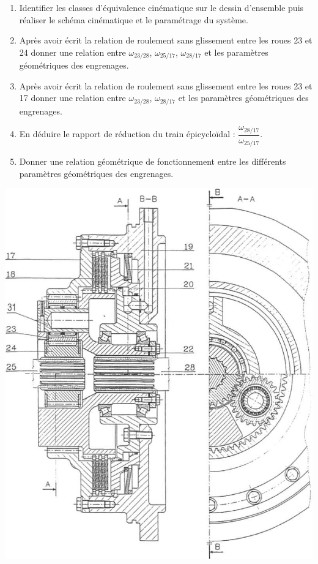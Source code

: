 \documentclass[10pt,oneside]{article}
\begin{document}
\begin{minipage}[c]{.4\linewidth}

\begin{enumerate}
\item Identifier les classes d'équivalence cinématique sur le dessin d'ensemble puis réaliser le schéma cinématique et le paramétrage du système.
\item Après avoir écrit la relation de roulement sans glissement entre les roues 23 et 24 donner une relation entre $\omega_{23/28}$, $\omega_{25/17}$, $\omega_{28/17}$ et les paramètres géométriques des engrenages.
\item Après avoir écrit la relation de roulement sans glissement entre les roues 23 et 17 donner une relation entre $\omega_{23/28}$, $\omega_{28/17}$ et les paramètres géométriques des engrenages.
\item En déduire le rapport de réduction du train épicycloïdal : $\dfrac{\omega_{28/17}}{\omega_{25/17}}$.
\item Donner une relation géométrique de fonctionnement entre les différents paramètres géométriques des engrenages.
\end{enumerate}
\end{minipage}\hfill
\begin{minipage}[c]{.55\linewidth}
\begin{center}
\includegraphics[width=.95\textwidth]{png/fig9}
\end{center}
\end{minipage}
\end{document}
